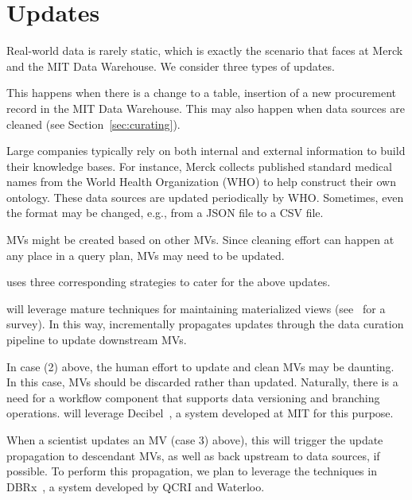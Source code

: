 \section{Updates}
\label{sec:updates}

Real-world data is rarely static, which is exactly the scenario that \dcv faces
at Merck and the MIT Data Warehouse. We consider three types of updates.

 This happens when there is a
change to a table, \eg insertion of a new procurement record in the MIT Data
Warehouse. This may also happen when data sources are cleaned (see
Section~\ref{sec:curating}).


 Large companies typically rely on
both internal and external information to build their knowledge bases. For
instance, Merck collects published standard medical names from the World Health
Organization (WHO) to help construct their own ontology. These data sources are
updated periodically by WHO.  Sometimes, even the format may be changed, e.g.,
from a JSON file to a CSV file.


 MVs might be created based on other MVs.  Since
cleaning effort can happen at any place in a query plan, MVs may need to be
updated.


\dcv uses three corresponding strategies to cater for the above updates.


 \dcv will leverage mature techniques for maintaining materialized views (see~\cite{DBLP:journals/debu/GuptaM95} for a survey).  In this way, \dcv incrementally propagates updates through the data curation pipeline to update downstream MVs.




  In case (2) above, the human effort to update and clean MVs may be daunting. In this case, MVs should be discarded rather than updated. Naturally, there is a need for a workflow component that supports data versioning and branching operations. \dcv will leverage Decibel~\cite{DBLP:journals/pvldb/MaddoxGEMPD16}, a system developed at MIT for this purpose.

 When a scientist updates an MV (case 3) above), this will trigger the update propagation to descendant MVs, as well as back upstream to data sources, if possible. To perform this propagation, we plan to leverage the techniques in DBRx~\cite{DBLP:conf/sigmod/ChalamallaIOP14}, a system developed by QCRI and Waterloo.




